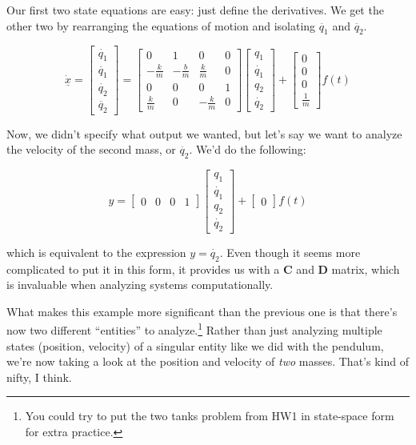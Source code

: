 \documentclass[
  letterpaper,
  DIV=11,
  numbers=noendperiod]{scrreprt}
\begin{document}
Our first two state equations are easy: just define the derivatives. We
get the other two by rearranging the equations of motion and isolating
\(\ddot{q_1}\) and \(\ddot{q_2}\).

\[\dot{\underline{x}} = \begin{bmatrix}
    \dot{q_1} \\
    \ddot{q_1} \\
    \dot{q_2} \\ 
    \ddot{q_2}
  \end{bmatrix} = \begin{bmatrix}
    0 & 1 & 0 & 0\\
    -\frac{k}{m} & -\frac{b}{m} & \frac{k}{m} & 0 \\
    0 & 0 & 0 & 1\\
    \frac{k}{m} & 0 & -\frac{k}{m} & 0
\end{bmatrix} \begin{bmatrix}
    q_1 \\
    \dot{q_1} \\
    q_2 \\ 
    \dot{q_2} \end{bmatrix} + \begin{bmatrix}
        0 \\
    0 \\
    0 \\ 
    \frac{1}{m} \end{bmatrix} f(t)\]

Now, we didn't specify what output we wanted, but let's say we want to
analyze the velocity of the second mass, or \(\dot{q_2}\). We'd do the
following:

\[y = \begin{bmatrix} 0 & 0 & 0 & 1\end{bmatrix} \begin{bmatrix}
    q_1 \\
    \dot{q_1} \\
    q_2 \\ 
    \dot{q_2} \end{bmatrix} + \begin{bmatrix} 0 \end{bmatrix} f(t)\]

which is equivalent to the expression \(y = \dot{q_2}\). Even though it
seems more complicated to put it in this form, it provides us with a
\(\textbf{C}\) and \(\textbf{D}\) matrix, which is invaluable when
analyzing systems computationally.

What makes this example more significant than the previous one is that
there's now two different ``entities'' to analyze.\footnote{You could
  try to put the two tanks problem from HW1 in state-space form for
  extra practice.} Rather than just analyzing multiple states (position,
velocity) of a singular entity like we did with the pendulum, we're now
taking a look at the position and velocity of \emph{two} masses. That's
kind of nifty, I think.
\end{document}
